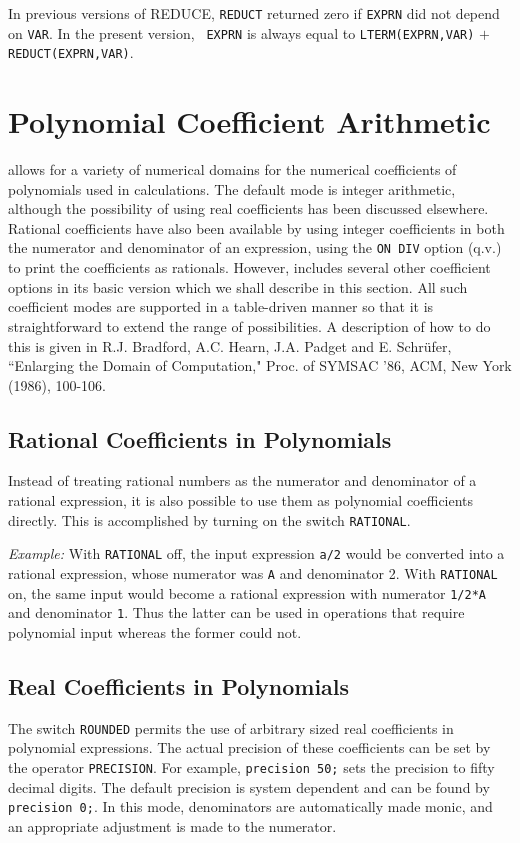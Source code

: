 {\COMPATNOTE} In previous versions of REDUCE, {\tt REDUCT} returned zero
if {\tt EXPRN} did not depend on {\tt VAR}.  In the present version, {\tt
EXPRN} is always equal to {\tt LTERM(EXPRN,VAR)} $+$ {\tt
REDUCT(EXPRN,VAR)}.

\section{Polynomial Coefficient Arithmetic}
{\REDUCE} allows for a variety of numerical domains for the numerical
coefficients of polynomials used in calculations.  The default mode is
integer arithmetic, although the possibility of using real coefficients
 has been discussed elsewhere.  Rational
coefficients have also been available by using integer coefficients in
both the numerator and denominator of an expression, using the {\tt ON
DIV}  option (q.v.) to print the coefficients as rationals.
However, {\REDUCE} includes several other coefficient options in its basic
version which we shall describe in this section.  All such coefficient
modes are supported in a table-driven manner so that it is
straightforward to extend the range of possibilities.  A description of
how to do this is given in R.J.  Bradford, A.C.  Hearn, J.A.  Padget and
E. Schr\"ufer, ``Enlarging the {\REDUCE} Domain of Computation," Proc. of
SYMSAC '86, ACM, New York (1986), 100-106.

\subsection{Rational Coefficients in Polynomials}
Instead of treating rational numbers as the numerator and denominator of a
rational expression, it is also possible to use them as polynomial
coefficients directly. This is accomplished by turning on the switch
{\tt RATIONAL}.

{\it Example:} With {\tt RATIONAL} off, the input expression {\tt a/2}
would be converted into a rational expression, whose numerator was {\tt A}
and denominator 2.  With {\tt RATIONAL} on, the same input would become a
rational expression with numerator {\tt 1/2*A} and denominator {\tt 1}.
Thus the latter can be used in operations that require polynomial input
whereas the former could not.

\subsection{Real Coefficients in Polynomials}
The switch {\tt ROUNDED} permits the use of arbitrary
sized real coefficients in polynomial expressions.  The actual precision
of these coefficients can be set by the operator {\tt PRECISION}.
 For example, {\tt precision 50;} sets the precision to
fifty decimal digits.  The default precision is system dependent and can
be found by {\tt precision 0;}.  In this mode, denominators are
automatically made monic, and an appropriate adjustment is made to the
numerator.

